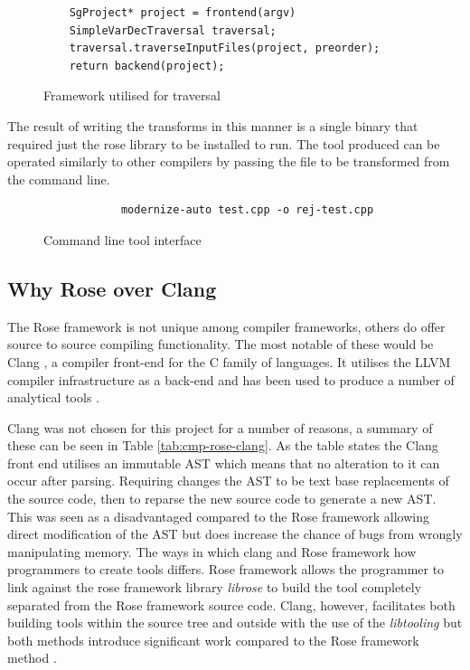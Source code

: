 \documentclass[bsc,frontabs,singlespacing,twoside,parskip,deptreport]{infthesis}
\begin{document}
\begin{figure}[!h]
    \centering
    \begin{verbatim}
    SgProject* project = frontend(argv)
    SimpleVarDecTraversal traversal;
    traversal.traverseInputFiles(project, preorder);
    return backend(project);
    \end{verbatim}
    \caption{Framework utilised for traversal}
    \label{fig:trav-proj}
\end{figure}

The result of writing the transforms in this manner is a single binary that required just the rose library to be installed to run. The tool produced can be operated similarly to other compilers by passing the file to be transformed from the command line.

\begin{figure}[!h]
    \centering
    \begin{verbatim}
            modernize-auto test.cpp -o rej-test.cpp
    \end{verbatim}
    \caption{Command line tool interface}
    \label{fig:cmd-opt}
\end{figure}

    
\subsection{Why Rose over Clang}
The Rose framework is not unique among compiler frameworks, others do offer source to source compiling functionality. The most notable of these would be Clang \cite{CLANG}, a compiler front-end for the C family of languages. It utilises the LLVM compiler infrastructure as a back-end and has been used to produce a number of analytical tools \cite{CLANG_TOOLS}. 

Clang was not chosen for this project for a number of reasons, a summary of these can be seen in Table \ref{tab:cmp-rose-clang}. As the table states the Clang front end utilises an immutable AST which means that no alteration to it can occur after parsing. Requiring changes the AST to be text base replacements of the source code, then to reparse the new source code to generate a new AST. This was seen as a disadvantaged compared to the Rose framework allowing direct modification of the AST but does increase the chance of bugs from wrongly manipulating memory. The ways in which clang and Rose framework how programmers to create tools differs. Rose framework allows the programmer to link against the rose framework library \textit{librose} to build the tool completely separated from the Rose framework source code. Clang, however, facilitates both building tools within the source tree and outside with the use of the \textit{libtooling} \cite{CLANG_TOOLS_LIB} but both methods introduce significant work compared to the Rose framework method \cite{ROSE_MAKE}.
\end{document}
